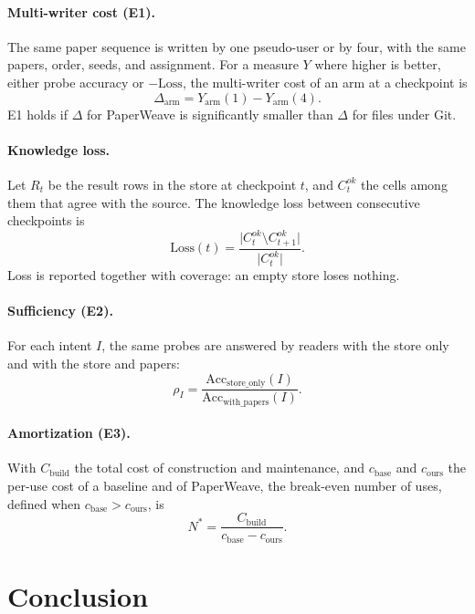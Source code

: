 \documentclass[sigconf,review,anonymous]{acmart}
\begin{document}
\paragraph{Multi-writer cost (E1).}
The same paper sequence is written by one pseudo-user or by four, with the
same papers, order, seeds, and assignment. For a measure $Y$ where higher is
better, either probe accuracy or $-\mathrm{Loss}$, the multi-writer cost of an
arm at a checkpoint is
\begin{equation}
\label{eq:multiwriter-cost}
\Delta_{\text{arm}} = Y_{\text{arm}}(1) - Y_{\text{arm}}(4).
\end{equation}
E1 holds if $\Delta$ for PaperWeave is significantly smaller than $\Delta$ for
files under Git.

\paragraph{Knowledge loss.}
Let $R_t$ be the result rows in the store at checkpoint $t$, and $C^{ok}_t$
the cells among them that agree with the source. The knowledge loss between
consecutive checkpoints is
\begin{equation}
\label{eq:loss}
\mathrm{Loss}(t)=\frac{\lvert C^{ok}_t\setminus C^{ok}_{t+1}\rvert}
  {\lvert C^{ok}_t\rvert}.
\end{equation}
Loss is reported together with coverage: an empty store loses nothing.

\paragraph{Sufficiency (E2).}
For each intent $I$, the same probes are answered by readers with the store
only and with the store and papers:
\begin{equation}
\label{eq:sufficiency}
\rho_I=\frac{\mathrm{Acc}_{\text{store\_only}}(I)}
  {\mathrm{Acc}_{\text{with\_papers}}(I)}.
\end{equation}

\paragraph{Amortization (E3).}
With $C_{\text{build}}$ the total cost of construction and maintenance, and
$c_{\text{base}}$ and $c_{\text{ours}}$ the per-use cost of a baseline and of
PaperWeave, the break-even number of uses, defined when
$c_{\text{base}}>c_{\text{ours}}$, is
\begin{equation}
\label{eq:breakeven}
N^{*}=\frac{C_{\text{build}}}{c_{\text{base}}-c_{\text{ours}}}.
\end{equation}

\section{Conclusion}
\label{sec:conclusion}

\label{endofbody}




\end{document}
